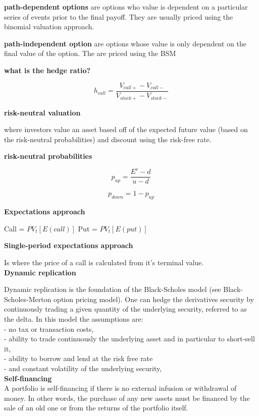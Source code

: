 \documentclass[12pt]{article}
\begin{document}
\textbf{path-dependent options} are options who value is dependent on a particular series of events prior to the final payoff. They are usually priced using the binomial valuation approach. 

\textbf{path-independent option} are options whose value is only dependent on the final value of the option. The are priced using the BSM

\textbf{what is the hedge ratio?}

$$
h_{call}= \dfrac{V_{call+} - V_{call-}}{V_{stock+} - V_{stock-}}
$$


\textbf{risk-neutral valuation}

where investors value an asset based off of the expected future value (based on the risk-neutral probabilities)  and discount using the risk-free rate. 

\textbf{risk-neutral probabilities}

$$
p_{up} = \dfrac{E^{r} - d}{u - d}
$$

$$
p_{down} = 1 - p_{up} 
$$

\textbf{Expectations approach}

Call = $PV_t[E(call)]$
Put = $PV_t[E(put)]$

\textbf{Single-period expectations approach}

Is where the price of a call is calculated from it's terminal value.  \\

\textbf{Dynamic replication}

Dynamic replication is the foundation of the Black-Scholes model (see Black-Scholes-Merton option pricing model). One can hedge the derivatives security by continuously trading a given quantity of the underlying
security, referred to as the delta. In this model the assumptions are: \\
- no tax or transaction costs, \\
- ability to trade continuously the underlying asset and in particular to short-sell it,  \\
- ability to borrow and lend at the risk free rate  \\
- and constant volatility of the underlying security, \\




\textbf{Self-financing} \\

A portfolio is self-financing if there is no external infusion or withdrawal of money. In other words, the purchase of any new assets must be financed by the sale of an old one or from the returns of the portfolio itself. \\
\end{document}

